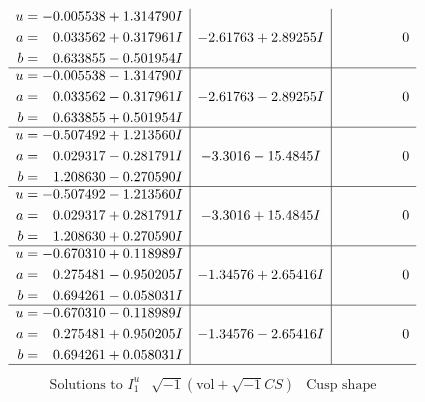 \documentclass[1p]{elsarticle_modified}
\theoremstyle{definition}
\newcommand{\I}{\sqrt{-1}}
\begin{document}
$$\begin{array}{c|c|c}
\begin{aligned}
u &= -0.005538 + 1.314790 I \\
a &= \phantom{-}0.033562 + 0.317961 I \\
b &= \phantom{-}0.633855 - 0.501954 I\end{aligned}
 & -2.61763 + 2.89255 I & \phantom{-0.000000 } 0 \\ \hline\begin{aligned}
u &= -0.005538 - 1.314790 I \\
a &= \phantom{-}0.033562 - 0.317961 I \\
b &= \phantom{-}0.633855 + 0.501954 I\end{aligned}
 & -2.61763 - 2.89255 I & \phantom{-0.000000 } 0 \\ \hline\begin{aligned}
u &= -0.507492 + 1.213560 I \\
a &= \phantom{-}0.029317 - 0.281791 I \\
b &= \phantom{-}1.208630 - 0.270590 I\end{aligned}
 & -3.3016 - 15.4845 I & \phantom{-0.000000 } 0 \\ \hline\begin{aligned}
u &= -0.507492 - 1.213560 I \\
a &= \phantom{-}0.029317 + 0.281791 I \\
b &= \phantom{-}1.208630 + 0.270590 I\end{aligned}
 & -3.3016 + 15.4845 I & \phantom{-0.000000 } 0 \\ \hline\begin{aligned}
u &= -0.670310 + 0.118989 I \\
a &= \phantom{-}0.275481 - 0.950205 I \\
b &= \phantom{-}0.694261 - 0.058031 I\end{aligned}
 & -1.34576 + 2.65416 I & \phantom{-0.000000 } 0 \\ \hline\begin{aligned}
u &= -0.670310 - 0.118989 I \\
a &= \phantom{-}0.275481 + 0.950205 I \\
b &= \phantom{-}0.694261 + 0.058031 I\end{aligned}
 & -1.34576 - 2.65416 I & \phantom{-0.000000 } 0\\
 \hline 
 \end{array}$$\newpage$$\begin{array}{c|c|c}  
\text{Solutions to }I^u_{1}& \I (\text{vol} + \sqrt{-1}CS) & \text{Cusp shape}\\
 \hline 
\begin{aligned}

\end{aligned}
\end{array}$$
\end{document}
